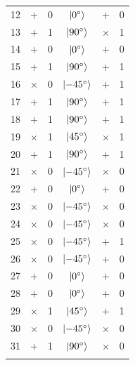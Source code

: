 \begin{longtable}{c|cc|ccc}
  12 & $+$      & 0 & $\ket{\SI{0}{\degree}}$   & $+$      & 0 \\
  13 & $+$      & 1 & $\ket{\SI{90}{\degree}}$  & $\times$ & 1 \\
  \rowcolor{green!20}

  14 & $+$      & 0 & $\ket{\SI{0}{\degree}}$   & $+$      & 0 \\
  \rowcolor{green!20}

  15 & $+$      & 1 & $\ket{\SI{90}{\degree}}$  & $+$      & 1 \\
  16 & $\times$ & 0 & $\ket{\SI{-45}{\degree}}$   & $+$      & 1 \\
  \rowcolor{green!20}

  17 & $+$      & 1 & $\ket{\SI{90}{\degree}}$  & $+$      & 1 \\
  \rowcolor{green!20}
  18 & $+$      & 1 & $\ket{\SI{90}{\degree}}$  & $+$      & 1 \\
  \rowcolor{green!20}
  19 & $\times$ & 1 & $\ket{\SI{45}{\degree}}$   & $\times$ & 1 \\
  \rowcolor{green!20}
  20 & $+$      & 1 & $\ket{\SI{90}{\degree}}$  & $+$      & 1 \\
  \rowcolor{green!20}
  21 & $\times$ & 0 & $\ket{\SI{-45}{\degree}}$   & $\times$ & 0 \\
  \rowcolor{green!20}
  22 & $+$      & 0 & $\ket{\SI{0}{\degree}}$    & $+$      & 0 \\
  \rowcolor{green!20}

  23 & $\times$ & 0 & $\ket{\SI{-45}{\degree}}$   & $\times$ & 0 \\
  \rowcolor{green!20}

  24 & $\times$ & 0 & $\ket{\SI{-45}{\degree}}$   & $\times$ & 0 \\
  25 & $\times$ & 0 & $\ket{\SI{-45}{\degree}}$   & $+$      & 1 \\
  26 & $\times$ & 0 & $\ket{\SI{-45}{\degree}}$   & $+$      & 0 \\
  \rowcolor{green!20}

  27 & $+$      & 0 & $\ket{\SI{0}{\degree}}$    & $+$      & 0 \\
  \rowcolor{green!20}

  28 & $+$      & 0 & $\ket{\SI{0}{\degree}}$    & $+$      & 0 \\
  29 & $\times$ & 1 & $\ket{\SI{45}{\degree}}$   & $+$      & 1 \\
  \rowcolor{green!20}

  30 & $\times$      & 0 & $\ket{\SI{-45}{\degree}}$    & $\times$ & 0 \\
  31 & $+$ & 1 & $\ket{\SI{90}{\degree}}$   & $\times$ & 0 \\
  \rowcolor{green!20}


\end{longtable}
